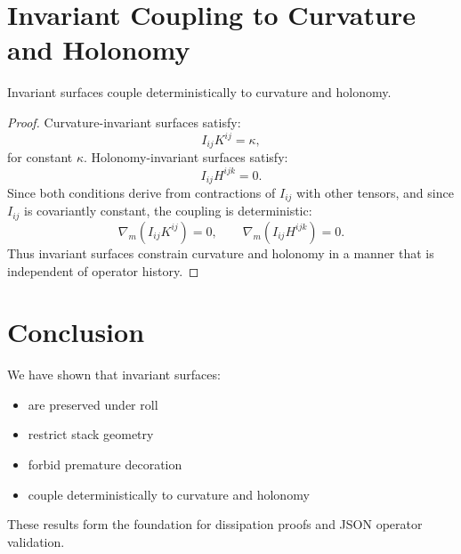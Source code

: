 \documentclass[12pt]{article}
\begin{document}
\section{Invariant Coupling to Curvature and Holonomy}

\begin{theorem}
Invariant surfaces couple deterministically to curvature and holonomy.
\end{theorem}

\begin{proof}
Curvature-invariant surfaces satisfy:
\[
I_{ij} K^{ij} = \kappa,
\]
for constant $\kappa$. Holonomy-invariant surfaces satisfy:
\[
I_{ij} H^{ijk} = 0.
\]
Since both conditions derive from contractions of $I_{ij}$ with other tensors,
and since $I_{ij}$ is covariantly constant, the coupling is deterministic:
\[
\nabla_m (I_{ij} K^{ij}) = 0, \qquad
\nabla_m (I_{ij} H^{ijk}) = 0.
\]
Thus invariant surfaces constrain curvature and holonomy in a manner that is
independent of operator history.
\end{proof}

\section*{Conclusion}
We have shown that invariant surfaces:

\begin{itemize}
    \item are preserved under roll
    \item restrict stack geometry
    \item forbid premature decoration
    \item couple deterministically to curvature and holonomy
\end{itemize}

These results form the foundation for dissipation proofs and JSON operator
validation.
\end{document}
